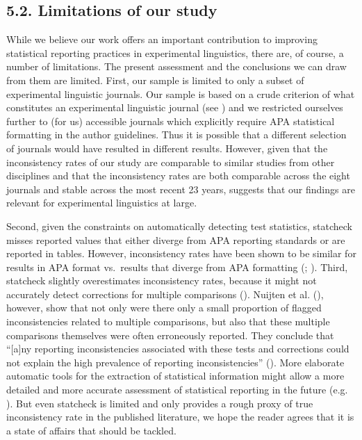 \documentclass[
  doc,
  longtable,
  nolmodern,
  notxfonts,
  notimes,
  colorlinks=true,linkcolor=blue,citecolor=blue,urlcolor=blue]{apa7}
\begin{document}
\subsection{5.2. Limitations of our
study}\label{limitations-of-our-study}

While we believe our work offers an important contribution to improving
statistical reporting practices in experimental linguistics, there are,
of course, a number of limitations. The present assessment and the
conclusions we can draw from them are limited. First, our sample is
limited to only a subset of experimental linguistic journals. Our sample
is based on a crude criterion of what constitutes an experimental
linguistic journal (see ) and we restricted ourselves further to (for us)
accessible journals which explicitly require APA statistical formatting
in the author guidelines. Thus it is possible that a different selection
of journals would have resulted in different results. However, given
that the inconsistency rates of our study are comparable to similar
studies from other disciplines and that the inconsistency rates are both
comparable across the eight journals and stable across the most recent
23 years, suggests that our findings are relevant for experimental
linguistics at large.

Second, given the constraints on automatically detecting test
statistics, statcheck misses reported values that either diverge from
APA reporting standards or are reported in tables. However,
inconsistency rates have been shown to be similar for results in APA
format vs.~results that diverge from APA formatting
(;
). Third,
statcheck slightly overestimates inconsistency rates, because it might
not accurately detect corrections for multiple comparisons
(). Nuijten et al.
(), however, show that not only
were there only a small proportion of flagged inconsistencies related to
multiple comparisons, but also that these multiple comparisons
themselves were often erroneously reported. They conclude that
``{[}a{]}ny reporting inconsistencies associated with these tests and
corrections could not explain the high prevalence of reporting
inconsistencies'' (). More elaborate automatic tools for the extraction of
statistical information might allow a more detailed and more accurate
assessment of statistical reporting in the future (e.g.
). But even
statcheck is limited and only provides a rough proxy of true
inconsistency rate in the published literature, we hope the reader
agrees that it is a state of affairs that should be tackled.
\end{document}
